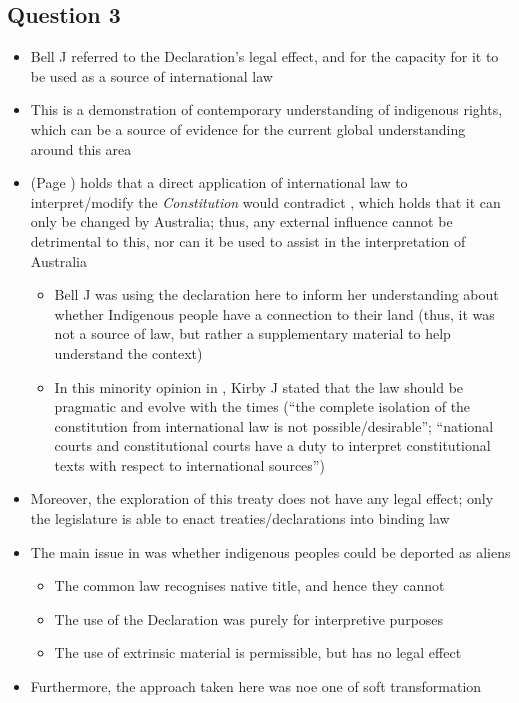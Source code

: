 \subsection*{Question 3}
\begin{itemize}
    \item Bell J referred to the Declaration's legal effect, and for the capacity for it to be used as a source of international law
    \item This is a demonstration of contemporary understanding of indigenous rights, which can be a source of evidence for the current global understanding around this area
    \item {} (Page \pageref{case:Al-Kateb v Godwin}) holds that a direct application of international law to interpret/modify the \textit{Constitution} would contradict , which holds that it can only be changed by Australia; thus, any external influence cannot be detrimental to this, nor can it be used to assist in the interpretation of Australia
    \begin{itemize}
        \item Bell J was using the declaration here to inform her understanding about whether Indigenous people have a connection to their land (thus, it was not a source of law, but rather a supplementary material to help understand the context)
        \item In this minority opinion in , Kirby J stated that the law should be pragmatic and evolve with the times (``the complete isolation of the constitution from international law is not possible/desirable''; ``national courts and constitutional courts have a duty to interpret constitutional texts with respect to international sources'')
    \end{itemize}
    \item Moreover, the exploration of this treaty does not have any legal effect; only the legislature is able to enact treaties/declarations into binding law
    \item The main issue in  was whether indigenous peoples could be deported as aliens
    \begin{itemize}
        \item The common law recognises native title, and hence they cannot
        \item The use of the Declaration was purely for interpretive purposes
        \item The use of extrinsic material is permissible, but has no legal effect
    \end{itemize}
    \item Furthermore, the approach taken here was noe one of soft transformation
\end{itemize}

